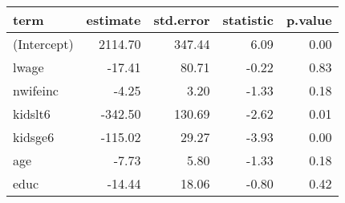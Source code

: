 \begin{tabular}{lrrrr}
  \hline
term & estimate & std.error & statistic & p.value \\ 
  \hline
(Intercept) & 2114.70 & 347.44 & 6.09 & 0.00 \\ 
  lwage & -17.41 & 80.71 & -0.22 & 0.83 \\ 
  nwifeinc & -4.25 & 3.20 & -1.33 & 0.18 \\ 
  kidslt6 & -342.50 & 130.69 & -2.62 & 0.01 \\ 
  kidsge6 & -115.02 & 29.27 & -3.93 & 0.00 \\ 
  age & -7.73 & 5.80 & -1.33 & 0.18 \\ 
  educ & -14.44 & 18.06 & -0.80 & 0.42 \\ 
   \hline
\end{tabular}
